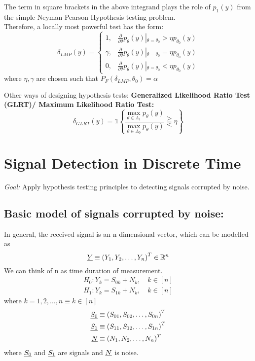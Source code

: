 \documentclass[12pt]{report}
\begin{document}
\noindent The term in square brackets in the above integrand plays the role of $p_1(y)$ from the simple Neyman-Pearson Hypothesis testing problem.
\\
Therefore, a locally most powerful test has the form:
\begin{equation}
\delta_{LMP}(y)=\begin{cases}
 1, & \frac{\partial}{\partial\theta}p_\theta(y)\left| {_{\theta = \theta_0}} \right.>\eta p_{\theta_0}(y)\\
    \gamma, & \frac{\partial}{\partial\theta}p_\theta(y)\left| {_{\theta = \theta_0}} \right.=\eta p_{\theta_0}(y)\\
    0, & \frac{\partial}{\partial\theta}p_\theta(y)\left| {_{\theta = \theta_0}} \right.<\eta p_{\theta_0}(y)
  \end{cases}
\end{equation}
where $\eta, \gamma$ are chosen such that $P_F(\delta_{LMP}, \theta_0) = \alpha$\\

\begin{rem}
Other ways of designing hypothesis tests:
\textbf{Generalized Likelihood Ratio Test (GLRT)/ Maximum Likelihood Ratio Test:}
\begin{equation}
\delta_{GLRT}(y) = \mathds{1} \left\{\frac{\underset{\theta\in\Lambda_1}{\max} p_\theta(y)}{\underset{\theta\in\Lambda_0}{\max} p_\theta(y)} \gtreqqless \eta\right\}
\end{equation}
\end{rem}

\section{Signal Detection in Discrete Time}

\noindent \emph{Goal:} Apply hypothesis testing principles to detecting signals corrupted by noise.

\subsection{Basic model of signals corrupted by noise:}
In general, the received signal is an n-dimensional vector, which can be modelled as
\[\emph{Y} \equiv {(Y_1,Y_2,\dots,Y_n)}^T \in \mathbb{R}^n\]
We can think of n as time duration of measurement.
\begin{align*}
H_0 : Y_k = S_{0k} + N_k , \quad  k \in [n]\\
H_1 : Y_k = S_{1k} + N_k , \quad  k \in [n]
\end{align*}
\noindent where $k = 1,2,\dots,n \equiv k \in [n]$
\begin{align*}
\emph{S_0} &\equiv {(S_{01},S_{02},\dots,S_{0n})}^T\\
\emph{S_1} &\equiv {(S_{11},S_{12},\dots,S_{1n})}^T\\
\emph{N} &\equiv {(N_1,N_2,\dots,N_n)}^T
\end{align*}
\noindent where $\emph{S_0}$ and $\emph{S_1}$ are signals and $\emph{N}$ is noise.\\
\end{document}
